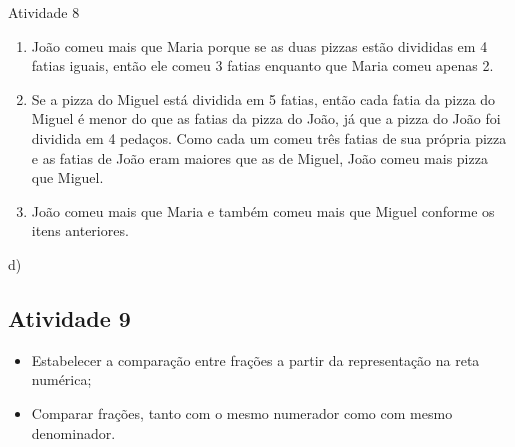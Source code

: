 \documentclass[oneside]{book}
\begin{document}
\begin{multicols}{2}
\begin{resposta*}{Atividade 8}  
\begin{enumerate} [\quad a)] %
    \item       João comeu mais que Maria porque se as duas pizzas estão divididas em 4 fatias iguais, então ele comeu 3 fatias enquanto que Maria comeu apenas 2.
    \item       Se a pizza do Miguel está dividida em 5 fatias, então cada fatia da pizza do Miguel é menor do que as fatias da pizza do João, já que a pizza do João foi dividida em 4 pedaços. Como cada um comeu três fatias de sua própria pizza e as fatias de João eram maiores que as de Miguel, João comeu mais pizza que Miguel.
    \item       João comeu mais que Maria e também comeu mais que Miguel conforme os itens anteriores.
\end{enumerate} %
\quad \;d)    
     

 
 \end{resposta*}

\subsection{Atividade 9}

\begin{itemize} %
    \item       Estabelecer a comparação entre frações a partir da representação na reta numérica;
    \item       Comparar frações, tanto com o mesmo numerador como com mesmo denominador.
\end{itemize} %


\end{multicols}
\end{document}
